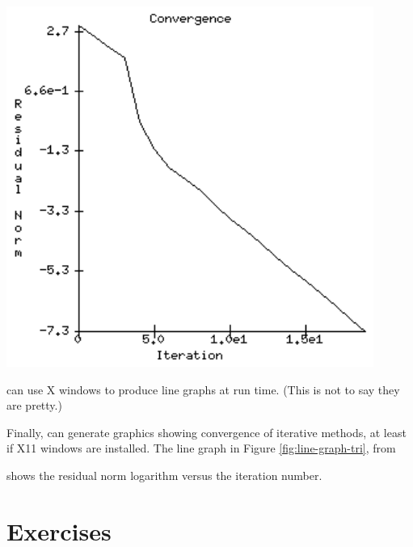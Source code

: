 \begin{marginfigure}
\bigskip
\includegraphics[width=0.9\textwidth]{line-graph-tri}
\caption{\PETSc can use X windows to produce line graphs at run time.  (This is not to say they are pretty.)}
\label{fig:line-graph-tri}
\end{marginfigure}

Finally, \PETSc can generate graphics showing convergence of iterative methods, at least if X11 windows are installed.  The line graph in Figure \ref{fig:line-graph-tri}, from
shows the residual norm logarithm versus the iteration number.

\bigskip
\section{Exercises}

